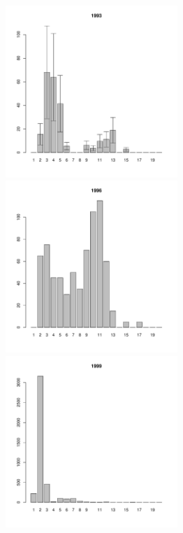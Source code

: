\documentclass[12pt, a4paper]{article}
\begin{document}
\begin{figure}[h]
\begin{multicols}{3}
\end{multicols}



\begin{multicols}{3}
\hfill
\includegraphics[width=65mm]{../White_Sea/Luvenga_Goreliy/middle_1993_.pdf}
\hfill
\includegraphics[width=65mm]{../White_Sea/Luvenga_Goreliy/middle_1996_.pdf}
\hfill
\includegraphics[width=65mm]{../White_Sea/Luvenga_Goreliy/middle_1999_.pdf}

\end{multicols}



\end{figure}
\end{document}
